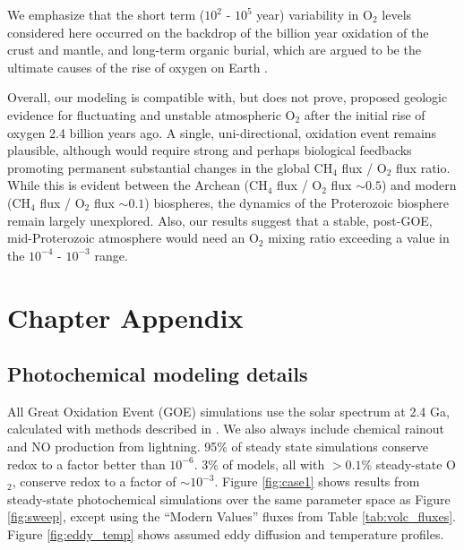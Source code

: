 We emphasize that the short term ($10^2$ - $10^5$ year) variability in O$_2$ levels considered here occurred on the backdrop of the billion year oxidation of the crust and mantle, and long-term organic burial, which are argued to be the ultimate causes of the rise of oxygen on Earth \citep[e.g.][]{Catling_2001}.

Overall, our modeling is compatible with, but does not prove, proposed geologic evidence for fluctuating and unstable atmospheric O$_2$ after the initial rise of oxygen 2.4 billion years ago. A single, uni-directional, oxidation event remains plausible, although would require strong and perhaps biological feedbacks promoting permanent substantial changes in the global CH$_4$ flux / O$_2$ flux ratio. While this is evident between the Archean (CH$_4$ flux / O$_2$ flux $\sim 0.5$) and modern (CH$_4$ flux / O$_2$ flux $\sim 0.1$) biospheres, the dynamics of the Proterozoic biosphere remain largely unexplored. Also, our results suggest that a stable, post-GOE, mid-Proterozoic atmosphere would need an O$_2$ mixing ratio exceeding a value in the $10^{-4}$ - $10^{-3}$ range. 

\section{Chapter Appendix} \label{sec:goe_appendix}

\subsection{Photochemical modeling details}

All Great Oxidation Event (GOE) simulations use the solar spectrum at 2.4 Ga, calculated with methods described in \citet{Claire_2012}. We also always include chemical rainout and NO production from lightning. 95\% of steady state simulations conserve redox to a factor better than $10^{-6}$. 3\% of models, all with $> 0.1\%$ steady-state O$_2$, conserve redox to a factor of $\sim10^{-3}$. Figure \ref{fig:case1} shows results from steady-state photochemical simulations over the same parameter space as Figure \ref{fig:sweep}, except using the ``Modern Values'' fluxes from Table \ref{tab:volc_fluxes}. Figure \ref{fig:eddy_temp} shows assumed eddy diffusion and temperature profiles. 

